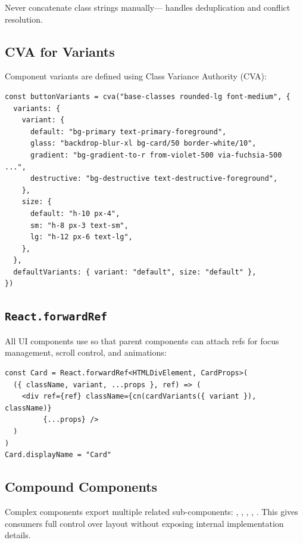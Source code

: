 Never concatenate class strings manually--- handles
deduplication and conflict resolution.

\subsection{CVA for Variants}

Component variants are defined using Class Variance Authority (CVA):

\begin{lstlisting}[style=typescript, caption={CVA variant definition for a Button.}]
const buttonVariants = cva("base-classes rounded-lg font-medium", {
  variants: {
    variant: {
      default: "bg-primary text-primary-foreground",
      glass: "backdrop-blur-xl bg-card/50 border-white/10",
      gradient: "bg-gradient-to-r from-violet-500 via-fuchsia-500 ...",
      destructive: "bg-destructive text-destructive-foreground",
    },
    size: {
      default: "h-10 px-4",
      sm: "h-8 px-3 text-sm",
      lg: "h-12 px-6 text-lg",
    },
  },
  defaultVariants: { variant: "default", size: "default" },
})
\end{lstlisting}

\subsection{\texttt{React.forwardRef}}

All UI components use  so that parent components
can attach refs for focus management, scroll control, and animations:

\begin{lstlisting}[style=typescript, caption={ForwardRef pattern.}]
const Card = React.forwardRef<HTMLDivElement, CardProps>(
  ({ className, variant, ...props }, ref) => (
    <div ref={ref} className={cn(cardVariants({ variant }), className)}
         {...props} />
  )
)
Card.displayName = "Card"
\end{lstlisting}

\subsection{Compound Components}

Complex components export multiple related sub-components:
, , , ,
.  This gives consumers full control over layout without
exposing internal implementation details.


